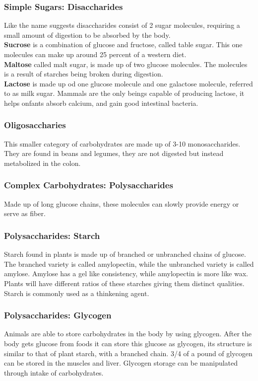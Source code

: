 \documentclass[letterpaper, 11pt]{article}
\begin{document}
\subsubsection{Simple Sugars: Disaccharides}
\label{sec:orgf298e65}
Like the name suggests disaccharides consist of 2 sugar molecules, requiring a small amount of digestion to be absorbed by the body.\\
\textbf{Sucrose} is a combination of glucose and fructose, called table sugar. This one molecules can make up around 25 percent of a western diet.\\
\textbf{Maltose} called malt sugar, is made up of two glucose molecules. The molecules is a result of starches being broken during digestion.\\
\textbf{Lactose} is made up od one glucose molecule and one galactose molecule, referred to as milk sugar. Mammals are the only beings capable of producing lactose, it helps onfants absorb calcium, and gain good intestinal bacteria.\\
\subsubsection{Oligosaccharies}
\label{sec:org3d0d605}
This smaller category of carbohydrates are made up of 3-10 monosaccharides. They are found in beans and legumes, they are not digested but instead metabolized in the colon.\\
\subsubsection{Complex Carbohydrates: Polysaccharides}
\label{sec:org91b015f}
Made up of long glucose chains, these molecules can slowly provide energy or serve as fiber.\\
\subsubsection{Polysaccharides: Starch}
\label{sec:orge388c0f}
Starch found in plants is made up of branched or unbranched chains of glucose. The branched variety is called amylopectin, while the unbranched variety is called amylose. Amylose has a gel like consistency, while amylopectin is more like wax. Plants will have different ratios of these starches giving them distinct qualities. Starch is commonly used as a thinkening agent.\\
\subsubsection{Polysaccharides: Glycogen}
\label{sec:org47ca6fd}
Animals are able to store carbohydrates in the body by using glycogen. After the body gets glucose from foods it can store this glucose as glycogen, its structure is similar to that of plant starch, with a branched chain. 3/4 of a pound of glycogen can be stored in the muscles and liver. Glycogen storage can be manipulated through intake of carbohydrates.\\
\end{document}
